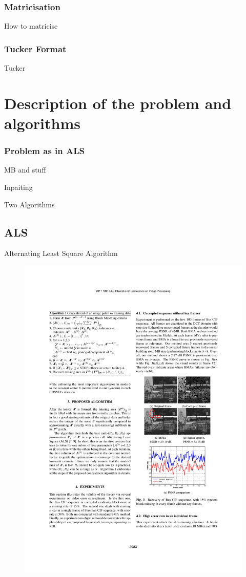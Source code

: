 \documentclass{beamer}
\begin{document}

\begin{frame}
\frametitle{Matricisation}
How to matricise
\end{frame}

\begin{frame}
\frametitle{Tucker Format}
Tucker
\end{frame}


\section{Description of the problem and algorithms} 
\begin{frame}
\frametitle{Problem as in ALS}
MB and stuff

Inpaiting

Two Algorithms
\end{frame}

\subsection{ALS}

\begin{frame}[fragile] %
\begin{block}{Alternating Least Square Algorithm}
\begin{figure}
\includegraphics[width=0.7\linewidth]{AlgoALS}
\end{figure}
\end{block}
\end{frame}
\end{document}
